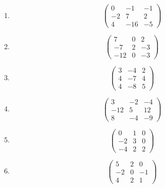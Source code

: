 \documentclass{article}
\begin{document}
\begin{enumerate}

\item $$\begin{pmatrix}
0 & -1 & -1 \\ 
-2 & 7 & 2 \\ 
4 & -16 & -5
\end{pmatrix}$$

\item $$\begin{pmatrix}
7 & 0 & 2 \\ 
-7 & 2 & -3 \\ 
-12 & 0 & -3
\end{pmatrix}$$

\item $$\begin{pmatrix}
3 & -4 & 2 \\ 
4 & -7 & 4 \\ 
4 & -8 & 5
\end{pmatrix}$$

\item $$\begin{pmatrix}
3 & -2 & -4 \\ 
-12 & 5 & 12 \\ 
8 & -4 & -9
\end{pmatrix}$$

\item $$\begin{pmatrix}
0 & 1 & 0 \\ 
-2 & 3 & 0 \\ 
-4 & 2 & 2
\end{pmatrix}$$

\item $$\begin{pmatrix}
5 & 2 & 0 \\ 
-2 & 0 & -1 \\ 
4 & 2 & 1
\end{pmatrix}$$
\end{enumerate}
\end{document}
